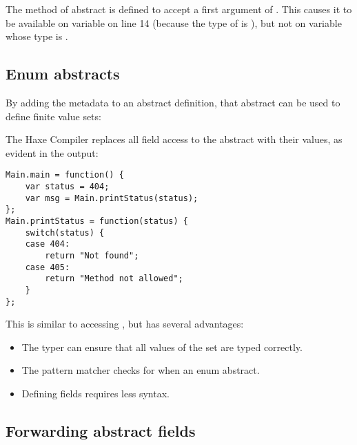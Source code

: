 The method  of abstract  is defined to accept a first argument of . This causes it to be available on variable  on line 14 (because the type of  is ), but not on variable  whose type is .



\subsection{Enum abstracts}
\label{types-abstract-enum}

By adding the  metadata to an abstract definition, that abstract can be used to define finite value sets:


The Haxe Compiler replaces all field access to the  abstract with their values, as evident in the  output:

\begin{lstlisting}
Main.main = function() {
	var status = 404;
	var msg = Main.printStatus(status);
};
Main.printStatus = function(status) {
	switch(status) {
	case 404:
		return "Not found";
	case 405:
		return "Method not allowed";
	}
};
\end{lstlisting}

This is similar to accessing , but has several advantages:

\begin{itemize}
	\item The typer can ensure that all values of the set are typed correctly.
	\item The pattern matcher checks for  when  an enum abstract.
	\item Defining fields requires less syntax.
\end{itemize}


\subsection{Forwarding abstract fields}
\label{types-abstract-forward}

